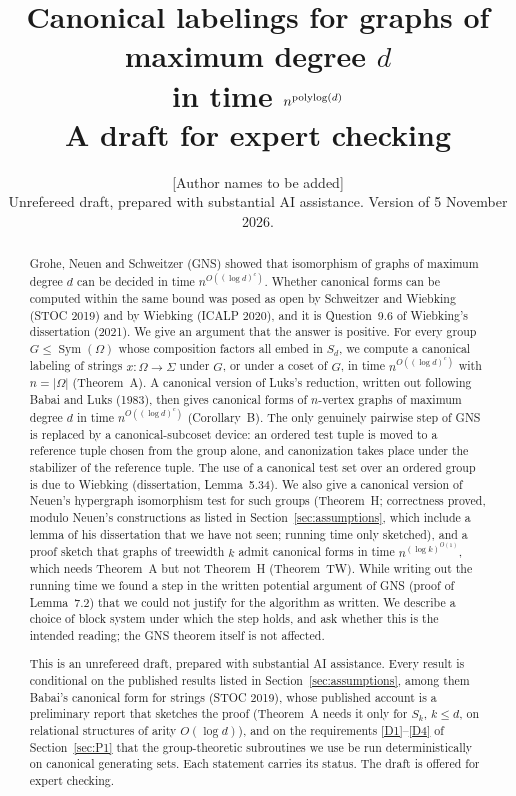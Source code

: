 \documentclass[11pt]{article}
\title{Canonical labelings for graphs of maximum degree $d$\\ in time $n^{\operatorname{polylog}(d)}$\\[4pt]
\large A draft for expert checking}
\author{[Author names to be added]\\[2pt]
\small Unrefereed draft, prepared with substantial AI assistance. Version of 5 November 2026.}
\date{}
\theoremstyle{plain}
\theoremstyle{definition}
\theoremstyle{remark}
\theoremstyle{named}
\theoremstyle{namedrm}
\newcommand{\Sym}{\operatorname{Sym}}
\begin{document}
\maketitle

\begin{abstract}
Grohe, Neuen and Schweitzer (GNS) showed that isomorphism of graphs of maximum degree $d$ can be
decided in time $n^{O((\log d)^c)}$. Whether canonical forms can be computed within the same bound was
posed as open by Schweitzer and Wiebking (STOC 2019) and by Wiebking (ICALP 2020), and it is
Question~9.6 of Wiebking's dissertation (2021). We give an argument that the answer is positive. For
every group $G\le\Sym(\Omega)$ whose composition factors all embed in $S_d$, we compute a canonical
labeling of strings $x\colon\Omega\to\Sigma$ under $G$, or under a coset of $G$, in time
$n^{O((\log d)^c)}$ with $n=|\Omega|$ (Theorem~A). A canonical version of Luks's reduction, written out
following Babai and Luks (1983), then gives canonical forms of $n$-vertex graphs of maximum degree $d$
in time $n^{O((\log d)^c)}$ (Corollary~B). The only genuinely pairwise step of GNS is replaced by a
canonical-subcoset device: an ordered test tuple is moved to a reference tuple chosen from the group
alone, and canonization takes place under the stabilizer of the reference tuple. The use of a canonical
test set over an ordered group is due to Wiebking (dissertation, Lemma~5.34).
We also give a canonical version of Neuen's hypergraph isomorphism test for such groups
(Theorem~H; correctness proved, modulo Neuen's constructions as listed in
Section~\ref{sec:assumptions}, which include a lemma of his dissertation that we have not seen; running
time only sketched), and a proof sketch that graphs of treewidth $k$ admit canonical forms in time $n^{(\log k)^{O(1)}}$, which needs
Theorem~A but not Theorem~H (Theorem~TW). While writing out the running time we found a step in the written potential
argument of GNS (proof of Lemma~7.2) that we could not justify for the algorithm as written. We describe
a choice of block system under which the step holds, and ask whether this is the intended reading; the
GNS theorem itself is not affected.

This is an unrefereed draft, prepared with substantial AI assistance. Every result is conditional on the
published results listed in Section~\ref{sec:assumptions}, among them Babai's canonical form for strings
(STOC 2019), whose published account is a preliminary report that sketches the proof (Theorem~A needs it
only for $S_k$, $k\le d$, on relational structures of arity $O(\log d)$), and on the requirements
\ref{D1}--\ref{D4} of Section~\ref{sec:P1} that the group-theoretic subroutines we use be run
deterministically on canonical generating sets. Each statement carries its status. The draft is offered
for expert checking.
\end{abstract}
\end{document}
